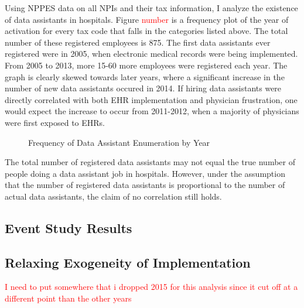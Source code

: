 \documentclass[11pt]{article}
\begin{document}
Using NPPES data on all NPIs and their tax information, I analyze the existence of data assistants in hospitals. Figure \textcolor{red}{number} is a frequency plot of the year of activation for every tax code that falls in the categories listed above. The total number of these registered employees is 875. The first data assistants ever registered were in 2005, when electronic medical records were being implemented. From 2005 to 2013, more 15-60 more employees were registered each year. The graph is clearly skewed towards later years, where a significant increase in the number of new data assistants occured in 2014. If hiring data assistants were directly correlated with both EHR implementation and physician frustration, one would expect the increase to occur from 2011-2012, when a majority of physicians were first exposed to EHRs. 


\vspace{5mm}
\begin{figure}[ht]
\caption{Frequency of Data Assistant Enumeration by Year}

    \label{fig:dataassistant_histogram}
\end{figure}

The total number of registered data assistants may not equal the true number of people doing a data assistant job in hospitals. However, under the assumption that the number of registered data assistants is proportional to the number of actual data assistants, the claim of no correlation still holds. 


\subsection{Event Study Results}






\subsection{Relaxing Exogeneity of Implementation}


\textcolor{red}{I need to put somewhere that i dropped 2015 for this analysis since it cut off at a different point than the other years}

\renewcommand*{\bibfont}{\footnotesize}

\printbibliography

\newpage

\appendix

\section{}
\end{document}
